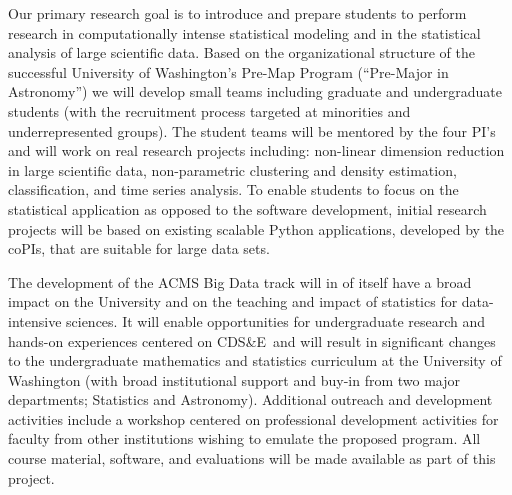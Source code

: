 \documentclass[nofootbib,floatfix,11pt]{article}
\newcommand{\cdse}{CDS\&E}
\begin{document}

Our primary research goal is to introduce and prepare students to
perform research in computationally intense statistical modeling and
in the statistical analysis of large scientific data. Based on the
organizational structure of the successful University of Washington's
Pre-Map Program (``Pre-Major in Astronomy'') we will develop small
teams including graduate and undergraduate students (with the
recruitment process targeted at minorities and underrepresented
groups).  The student teams will be mentored by the four PI's and will
work on real research projects including: non-linear dimension
reduction in large scientific data, non-parametric clustering and
density estimation, classification, and time series analysis. To
enable students to focus on the statistical application as opposed to
the software development, initial research projects will be based on
existing scalable Python applications, developed by the coPIs, that
are suitable for large data sets.

The development of the ACMS Big Data track will in of itself have a
broad impact on the University and on the teaching and impact of
statistics for data-intensive sciences. It will enable opportunities
for undergraduate research and hands-on experiences centered on \cdse\
and will result in significant changes to the undergraduate
mathematics and statistics curriculum at the University of Washington
(with broad institutional support and buy-in from two major
departments; Statistics and Astronomy). Additional outreach and
development activities include a workshop centered on professional
development activities for faculty from other institutions wishing to
emulate the proposed program. All course material, software, and
evaluations will be made available as part of this project. 
\end{document}
